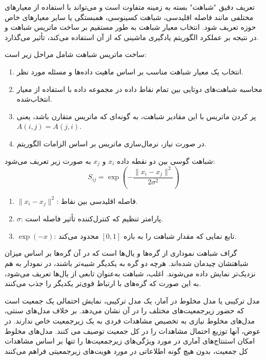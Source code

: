 \documentclass[a4paper,12pt,openany]{report}
\begin{document}
\begin{description}
		تعریف دقیق "شباهت" بسته به زمینه متفاوت است و می‌تواند با استفاده از معیارهای مختلفی مانند فاصله اقلیدسی، شباهت کسینوسی، همبستگی یا سایر معیارهای خاص حوزه تعریف شود. انتخاب معیار شباهت به طور مستقیم بر ساخت ماتریس شباهت و در نتیجه بر عملکرد الگوریتم یادگیری ماشینی که از آن استفاده می‌کند، تأثیر می‌گذارد.
		
		
		
		ساخت ماتریس شباهت شامل مراحل زیر است:
		\begin{enumerate}
			\item انتخاب یک معیار شباهت مناسب بر اساس ماهیت داده‌ها و مسئله مورد نظر.
			\item محاسبه شباهت‌های دوتایی بین تمام نقاط داده در مجموعه داده با استفاده از معیار انتخاب‌شده.
			\item پر کردن ماتریس با این مقادیر شباهت، به گونه‌ای که ماتریس متقارن باشد، یعنی \( A(i, j) = A(j, i) \).
			\item در صورت نیاز، نرمال‌سازی ماتریس بر اساس الزامات الگوریتم.
		\end{enumerate}
		
		\item[\textbullet\ شباهت گوسی:] 
		
		شباهت گوسی بین دو نقطه داده \( x_i \) و \( x_j \) به صورت زیر تعریف می‌شود:
		\[
		S_{ij} = \exp\left(-\frac{\|x_i - x_j\|^2}{2\sigma^2}\right)
		\]
		
		
		\begin{enumerate}
			\item \( \|x_i - x_j\|^2 \): فاصله اقلیدسی بین نقاط.
			\item \( \sigma \): پارامتر تنظیم که کنترل‌کننده تأثیر فاصله است.
			\item \( \exp(-x) \): تابع نمایی که مقدار شباهت را به بازه \([0, 1]\) محدود می‌کند.
		\end{enumerate}
		
		\item[\textbullet\ گراف شباهت:] گراف شباهت  نموداری از گره‌ها و یال‌ها است که در آن گره‌ها بر اساس میزان شباهتشان چیدمان شده‌اند. هرچه دو گره به یکدیگر شبیه‌تر باشند، در نمودار به هم نزدیک‌تر نمایش داده می‌شوند. اغلب، شباهت به‌عنوان تابعی از یال‌ها تعریف می‌شود، به این صورت که گره‌های با ارتباط قوی‌تر یکدیگر را جذب می‌کنند.
		\item[\textbullet\ مدل ترکیبی:] مدل ترکیبی یا مدل مخلوط  در آمار، یک مدل ترکیبی، نمایش احتمالی یک جمعیت است که حضور زیرجمعیت‌های مختلف را در آن نشان می‌دهد. بر خلاف مدل‌های سنتی، مدل‌های مخلوط نیازی به تخصیص مشاهدات فردی به یک زیرجمعیت خاص ندارند. در عوض، آنها توزیع احتمال مشاهدات را در کل جمعیت توصیف می کنند. مدل‌های مخلوط امکان استنتاج‌های آماری در مورد ویژگی‌های زیرجمعیت‌ها را تنها بر اساس مشاهدات کل جمعیت، بدون هیچ گونه اطلاعاتی در مورد هویت‌های زیرجمعیتی فراهم می‌کنند
		\item[\textbullet\ مدل مخلوط گوسی:]
		

\end{description}
\end{document}
